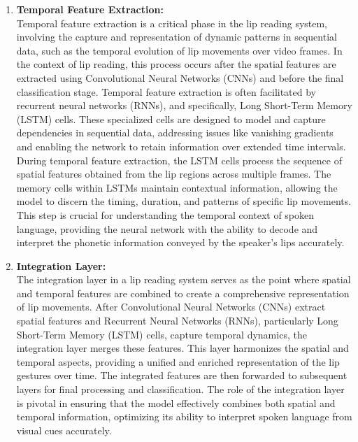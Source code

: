 \begin{enumerate}
	\item \textbf{Temporal Feature Extraction:}
	\\Temporal feature extraction is a critical phase in the lip reading system, involving the capture and representation of dynamic patterns in sequential data, such as the temporal evolution of lip movements over video frames. In the context of lip reading, this process occurs after the spatial features are extracted using Convolutional Neural Networks (CNNs) and before the final classification stage. Temporal feature extraction is often facilitated by recurrent neural networks (RNNs), and specifically, Long Short-Term Memory (LSTM) cells. These specialized cells are designed to model and capture dependencies in sequential data, addressing issues like vanishing gradients and enabling the network to retain information over extended time intervals. During temporal feature extraction, the LSTM cells process the sequence of spatial features obtained from the lip regions across multiple frames. The memory cells within LSTMs maintain contextual information, allowing the model to discern the timing, duration, and patterns of specific lip movements. This step is crucial for understanding the temporal context of spoken language, providing the neural network with the ability to decode and interpret the phonetic information conveyed by the speaker's lips accurately.

	\item \textbf{Integration Layer:}
	\\The integration layer in a lip reading system serves as the point where spatial and temporal features are combined to create a comprehensive representation of lip movements. After Convolutional Neural Networks (CNNs) extract spatial features and Recurrent Neural Networks (RNNs), particularly Long Short-Term Memory (LSTM) cells, capture temporal dynamics, the integration layer merges these features. This layer harmonizes the spatial and temporal aspects, providing a unified and enriched representation of the lip gestures over time. The integrated features are then forwarded to subsequent layers for final processing and classification. The role of the integration layer is pivotal in ensuring that the model effectively combines both spatial and temporal information, optimizing its ability to interpret spoken language from visual cues accurately.
	

\end{enumerate}
